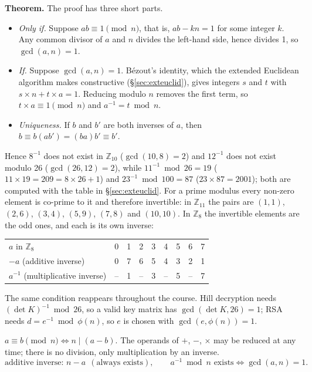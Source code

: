 \textbf{Theorem.}  The proof has three short parts.
\begin{itemize}[leftmargin=1.5em]
  \item \emph{Only if.} Suppose $ab \equiv 1 \pmod n$, that is, $ab - kn = 1$ for some integer $k$. Any common divisor of $a$ and $n$ divides the left-hand side, hence divides 1, so $\gcd(a, n) = 1$.
  \item \emph{If.} Suppose $\gcd(a, n) = 1$. Bézout's identity, which the extended Euclidean algorithm makes constructive (\S\ref{sec:exteuclid}), gives integers $s$ and $t$ with $s \times n + t \times a = 1$. Reducing modulo $n$ removes the first term, so $t \times a \equiv 1 \pmod n$ and $a^{-1} = t \bmod n$.
  \item \emph{Uniqueness.} If $b$ and $b'$ are both inverses of $a$, then $b \equiv b(ab') = (ba)b' \equiv b'$.
\end{itemize}
Hence $8^{-1}$ does not exist in $\mathbb{Z}_{10}$ ($\gcd(10, 8) = 2$) and $12^{-1}$ does not exist modulo 26 ($\gcd(26, 12) = 2$), while $11^{-1} \bmod 26 = 19$ ($11 \times 19 = 209 = 8 \times 26 + 1$) and $23^{-1} \bmod 100 = 87$ ($23 \times 87 = 2001$); both are computed with the table in \S\ref{sec:exteuclid}. For a prime modulus every non-zero element is co-prime to it and therefore invertible: in $\mathbb{Z}_{11}$ the pairs are $(1, 1)$, $(2, 6)$, $(3, 4)$, $(5, 9)$, $(7, 8)$ and $(10, 10)$. In $\mathbb{Z}_8$ the invertible elements are the odd ones, and each is its own inverse:
\begin{center}\small\setlength{\tabcolsep}{6pt}
\begin{tabular}{@{}l*{8}{c}@{}}
\toprule
$a$ in $\mathbb{Z}_8$ & 0&1&2&3&4&5&6&7\\
$-a$ (additive inverse) & 0&7&6&5&4&3&2&1\\
$a^{-1}$ (multiplicative inverse) & --&1&--&3&--&5&--&7\\
\bottomrule
\end{tabular}
\end{center}
The same condition reappears throughout the course. Hill decryption needs $(\det K)^{-1} \bmod 26$, so a valid key matrix has $\gcd(\det K, 26) = 1$; RSA needs $d = e^{-1} \bmod \phi(n)$, so $e$ is chosen with $\gcd(e, \phi(n)) = 1$.

\begin{mustknow}
$a \equiv b \pmod n \iff n \mid (a - b)$. The operands of $+$, $-$, $\times$ may be reduced at any time; there is no division, only multiplication by an inverse.
\[
\text{additive inverse: } n - a \ \ (\text{always exists}), \qquad
a^{-1} \bmod n \text{ exists} \iff \gcd(a, n) = 1 .
\]
\end{mustknow}


